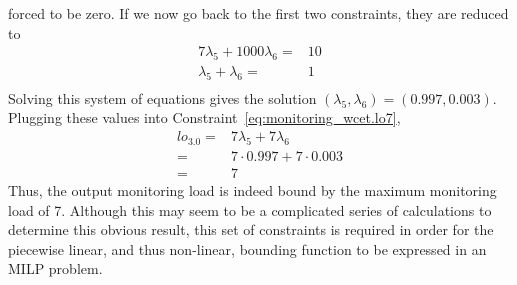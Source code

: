 forced to be zero. If we now go back to the first two constraints, they are
reduced to
\begin{align*}
  7\lambda_5 + 1000\lambda_6 =& 10\\
  \lambda_5 + \lambda_6 =& 1 \\
\end{align*}
Solving this system of equations gives the solution $(\lambda_5, \lambda_6) =
(0.997, 0.003)$. Plugging these values into Constraint~\ref{eq:monitoring_wcet.lo7},
\begin{align*}
  lo_{3.0} =& 7\lambda_5 + 7\lambda_6 \\
  =& 7\cdot 0.997 + 7\cdot 0.003 \\
  =& 7
\end{align*}
Thus, the output monitoring load is indeed bound by the maximum monitoring load
of 7. Although this may seem to be a complicated series of calculations to
determine this obvious result, this set of constraints is required in order for
the piecewise linear, and thus non-linear, bounding function to be expressed in
an MILP problem.

